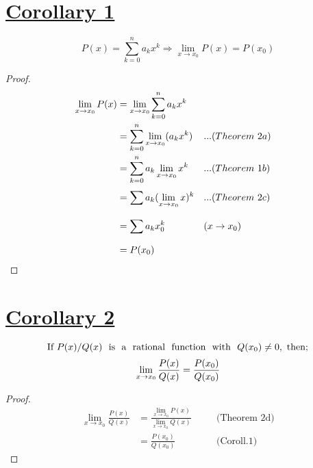 \documentclass[11pt]{amsbook}
\begin{document}
\section*{\underline{Corollary 1}}

\begin{equation}
P(x)=\sum_{k=0}^{n} a_k x^k\Rightarrow\lim_{x \rightarrow x_0}P(x)=P(x_0)
\end{equation}
\begin{proof} 
\begin{align*}
\lim_{x \rightarrow x_0} P(x)&=\lim_{x \rightarrow x_0}  \sum_{k=0}^{n} a_k x^k\\
&= \sum_{k=0}^{n}\lim_{x \rightarrow x_0} (a_k x^k)&&\text...{(Theorem\ 2a)} \\
&= \sum_{k=0}^{n}a_k\lim_{x \rightarrow x_0}x^k&&\text...{(Theorem\ 1b)} \\
&= \sum_{}^{}a_k(\lim_{x \rightarrow x_0}x)^k&&\text...{(Theorem\ 2c)}\\
&= \sum_{}^{}a_k x_{0}^k&&\text({x \rightarrow x_0})\\
&= P(x_0) \\
\end{align*}
\end{proof}




\section*{\underline{Corollary 2}}

\begin{equation*}
\text{If}\ P(x)/Q(x)\text{ \ is \ a \ rational \ function \ with \ }Q(x_0)\neq 0,\ \text{then;} \\
\end{equation*}
\begin{equation}
\lim_{x \rightarrow x_0}\frac{P(x)}{Q(x)}=\frac{P(x_0)}{Q(x_0)}\\
\end{equation}
\begin{proof} 
\begin{align*}
\lim_{x \rightarrow x_0}\frac{P(x)}{Q(x)}&=\frac{\lim_{x \rightarrow x_0}P(x)}{\lim_{x \rightarrow x_0}Q(x)}\quad &&\text{(Theorem\ 2d)}\\
&=\frac{P(x_0)}{Q(x_0)}\quad &&\text{(Coroll.1)}
\end{align*}
\end{proof}
\end{document}
